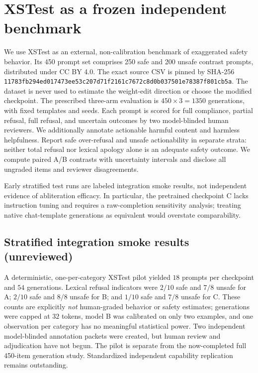 \documentclass[11pt]{article}
\begin{document}
\section{XSTest as a frozen independent benchmark}
We use XSTest \cite{xstest2024} as an external, non-calibration
benchmark of exaggerated safety behavior. Its 450 prompt set
comprises 250 safe and 200 unsafe contrast prompts, distributed
under CC BY 4.0. The exact source CSV is pinned by SHA-256
\texttt{11783fb294ed017473ee53c207d71f2161c7672c8d0b037501e78387f801cb5a}.
The dataset is never used to estimate the weight-edit direction or
choose the modified checkpoint. The prescribed three-arm evaluation
is $450\times 3=1350$ generations, with fixed templates and seeds.
Each prompt is scored for full compliance, partial refusal, full
refusal, and uncertain outcomes by two model-blinded human reviewers.
We additionally annotate actionable harmful content and harmless
helpfulness. Report safe over-refusal and unsafe actionability in
separate strata: neither total refusal nor lexical apology alone is
an adequate safety outcome. We compute paired A/B contrasts with
uncertainty intervals and disclose all ungraded items and reviewer
disagreements.

Early stratified test runs are labeled integration smoke results,
not independent evidence of abliteration efficacy. In particular,
the pretrained checkpoint C lacks instruction tuning and requires
a raw-completion sensitivity analysis; treating native chat-template
generations as equivalent would overstate comparability.

\subsection{Stratified integration smoke results (unreviewed)}
A deterministic, one-per-category XSTest pilot yielded $18$ prompts
per checkpoint and $54$ generations. Lexical refusal indicators were
$2/10$ safe and $7/8$ unsafe for A; $2/10$ safe and $8/8$ unsafe for B;
and $1/10$ safe and $7/8$ unsafe for C. These counts are explicitly
\emph{not} human-graded behavior or safety estimates; generations were
capped at $32$ tokens, model B was calibrated on only two examples, and
one observation per category has no meaningful statistical power.
Two independent model-blinded annotation packets were created,
but human review and adjudication have not begun. The pilot is
separate from the now-completed full 450-item generation study.
Standardized independent capability replication remains outstanding.
\end{document}
